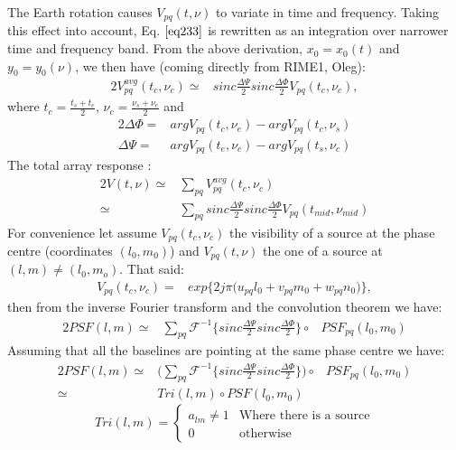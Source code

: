 The Earth rotation causes $V_{pq}(t, \nu)$ to variate in time and  frequency. 
Taking this effect into account, Eq. $\ref{eq233}$ is  rewritten as an integration over narrower time and frequency band. From the above 
derivation, $x_0=x_0(t)$ and $y_0=y_0(\nu)$, we then have (coming directly from RIME1, Oleg):
\begin{alignat}{2}
 V_{pq}^{avg}(t_c, \nu_c)\simeq& sinc\frac{\Delta \Psi}{2}sinc\frac{\Delta \Phi}{2} V_{pq}(t_{c},\nu_{c})\label{eq:visibility},
\end{alignat}
where $t_{c}=\frac{t_{s} + t_{e}}{2}$, $\nu_{c}=\frac{\nu_{s} + \nu_{e}}{2}$ and 
\begin{alignat}{2}
\Delta \Phi=&arg V_{pq}(t_{c},\nu_{e})-arg V_{pq}(t_{c},\nu_{s})\\
\Delta \Psi=&arg V_{pq}(t_{e},\nu_{c})-arg V_{pq}(t_{s},\nu_{c})
\end{alignat}
The total array response :
\begin{alignat}{2}
V(t,\nu)\simeq&\sum_{pq} V_{pq}^{avg}(t_c, \nu_c)\\
	\simeq&\sum_{pq} sinc\frac{\Delta \Psi}{2}sinc\frac{\Delta \Phi}{2} V_{pq}(t_{mid},\nu_{mid})
\end{alignat}
For convenience let assume $V_{pq}(t_{c},\nu_{c})$ the visibility of a source at the phase centre (coordinates $(l_0,m_0)$) and 
$V_{pq}(t,\nu)$ the one of a source at $(l,m)\neq(l_0,m_o)$. That said:
\begin{eqnarray}
 V_{pq}(t_c, \nu_c)=& exp\bigg\{2j\pi\big(u_{pq}l_0+v_{pq}m_0+ w_{pq}n_0\big)\bigg\},
\end{eqnarray}
then from the inverse Fourier transform and the convolution theorem we have:
\begin{alignat}{2}
PSF(l,m)\simeq& \sum_{pq}\mathcal{F}^{-1}\bigg\{sinc\frac{\Delta \Psi}{2}sinc\frac{\Delta \Phi}{2}\bigg\}
	\circ& PSF_{pq}(l_0,m_0)
\end{alignat}
Assuming that all the baselines are pointing at the same phase centre we have:
\begin{alignat}{2}
PSF(l,m)\simeq&\bigg(\sum_{pq}\mathcal{F}^{-1}\bigg\{sinc\frac{\Delta \Psi}{2}sinc\frac{\Delta \Phi}{2}\bigg\}\bigg)
	\circ& PSF_{pq}(l_0,m_0)\\
      \simeq& Tri(l,m)\circ PSF(l_0,m_0)\label{eqtota}
\end{alignat}
\begin{equation*}
Tri(l,m)=\left\{
\begin{array}{rl}
a_{lm}\neq 1 & \mbox{Where there is a source} \\
0 & \mbox{otherwise}
\end{array}\right.
\end{equation*}
